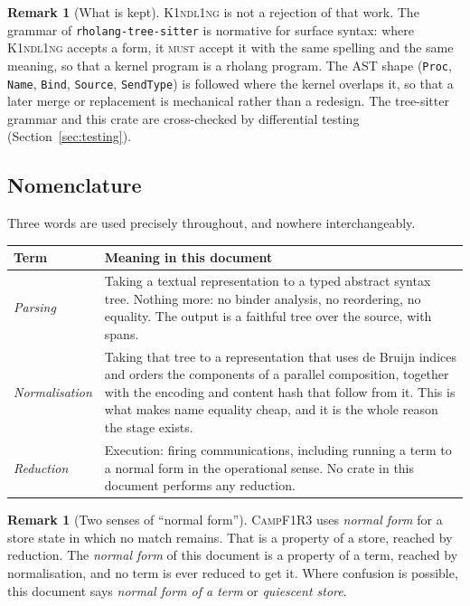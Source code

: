 \documentclass[11pt,a4paper]{article}
\newcommand{\code}[1]{\texttt{#1}}
\newcommand{\Kind}{\textsc{K1ndl1ng}}
\newcommand{\Camp}{\textsc{CampF1R3}}
\newcommand{\MUST}{\textsc{must}}
\theoremstyle{definition}
\newtheorem{remark}[definition]{Remark}
\theoremstyle{plain}
\begin{document}
\begin{remark}[What is kept]
\Kind{} is not a rejection of that work. The grammar of
\code{rholang-tree-sitter} is normative for surface syntax: where \Kind{} accepts
a form, it \MUST{} accept it with the same spelling and the same meaning, so that
a kernel program is a rholang program. The AST shape (\code{Proc}, \code{Name},
\code{Bind}, \code{Source}, \code{SendType}) is followed where the kernel
overlaps it, so that a later merge or replacement is mechanical rather than a
redesign. The tree-sitter grammar and this crate are cross-checked by
differential testing (Section~\ref{sec:testing}).
\end{remark}

\subsection{Nomenclature}\label{sec:nomen}

Three words are used precisely throughout, and nowhere interchangeably.

\begin{center}
\begin{tabularx}{\linewidth}{@{}l>{\raggedright\arraybackslash}X@{}}
\toprule
Term & Meaning in this document\\
\midrule
\emph{Parsing} & Taking a textual representation to a typed abstract syntax
tree. Nothing more: no binder analysis, no reordering, no equality. The output
is a faithful tree over the source, with spans.\\
\emph{Normalisation} & Taking that tree to a representation that uses de Bruijn
indices and orders the components of a parallel composition, together with the
encoding and content hash that follow from it. This is what makes name equality
cheap, and it is the whole reason the stage exists.\\
\emph{Reduction} & Execution: firing communications, including running a term to
a normal form in the operational sense. No crate in this document performs any
reduction.\\
\bottomrule
\end{tabularx}
\end{center}

\begin{remark}[Two senses of ``normal form'']
\Camp{} uses \emph{normal form} for a store state in which no match remains.
That is a property of a store, reached by reduction. The \emph{normal form} of
this document is a property of a term, reached by normalisation, and no term is
ever reduced to get it. Where confusion is possible, this document says
\emph{normal form of a term} or \emph{quiescent store}.
\end{remark}
\end{document}
